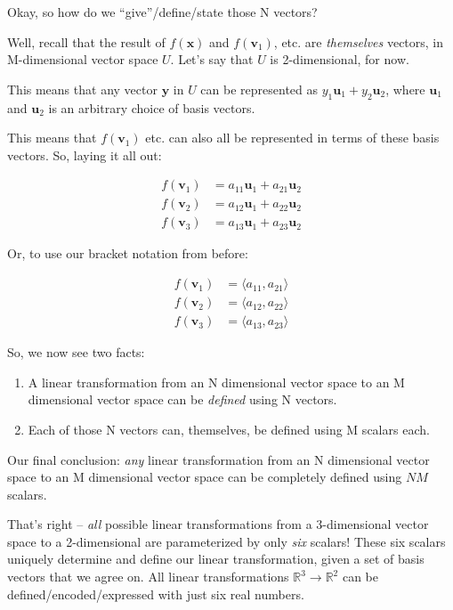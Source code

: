 \documentclass[]{article}
\begin{document}
Okay, so how do we ``give''/define/state those N vectors?

Well, recall that the result of \(f(\mathbf{x})\) and \(f(\mathbf{v}_1)\), etc.
are \emph{themselves} vectors, in M-dimensional vector space \(U\). Let's say
that \(U\) is 2-dimensional, for now.

This means that any vector \(\mathbf{y}\) in \(U\) can be represented as \(y_1
\mathbf{u}_1 + y_2 \mathbf{u}_2\), where \(\mathbf{u}_1\) and \(\mathbf{u}_2\)
is an arbitrary choice of basis vectors.

This means that \(f(\mathbf{v}_1)\) etc. can also all be represented in terms of
these basis vectors. So, laying it all out:

\[
\begin{aligned}
f(\mathbf{v}_1) & = a_{11} \mathbf{u}_1 + a_{21} \mathbf{u}_2 \\
f(\mathbf{v}_2) & = a_{12} \mathbf{u}_1 + a_{22} \mathbf{u}_2 \\
f(\mathbf{v}_3) & = a_{13} \mathbf{u}_1 + a_{23} \mathbf{u}_2
\end{aligned}
\]

Or, to use our bracket notation from before:

\[
\begin{aligned}
f(\mathbf{v}_1) & = \langle a_{11}, a_{21} \rangle \\
f(\mathbf{v}_2) & = \langle a_{12}, a_{22} \rangle \\
f(\mathbf{v}_3) & = \langle a_{13}, a_{23} \rangle
\end{aligned}
\]

So, we now see two facts:

\begin{enumerate}
\def\labelenumi{\arabic{enumi}.}
\tightlist
\item
  A linear transformation from an N dimensional vector space to an M dimensional
  vector space can be \emph{defined} using N vectors.
\item
  Each of those N vectors can, themselves, be defined using M scalars each.
\end{enumerate}

Our final conclusion: \emph{any} linear transformation from an N dimensional
vector space to an M dimensional vector space can be completely defined using
\(N M\) scalars.

That's right -- \emph{all} possible linear transformations from a 3-dimensional
vector space to a 2-dimensional are parameterized by only \emph{six} scalars!
These six scalars uniquely determine and define our linear transformation, given
a set of basis vectors that we agree on. All linear transformations
\(\mathbb{R}^3 \rightarrow \mathbb{R}^2\) can be defined/encoded/expressed with
just six real numbers.
\end{document}
